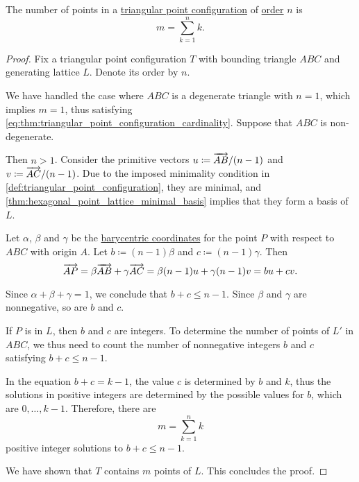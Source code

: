 \begin{proposition}\label{thm:triangular_point_configuration_cardinality}
  The number of points in a \hyperref[def:triangular_point_configuration]{triangular point configuration} of \hyperref[def:triangular_point_configuration_order]{order} \( n \) is
  \begin{equation}\label{eq:thm:triangular_point_configuration_cardinality}
    m = \sum_{k=1}^n k.
  \end{equation}
\end{proposition}
\begin{proof}
  Fix a triangular point configuration \( T \) with bounding triangle \( ABC \) and generating lattice \( L \). Denote its order by \( n \).

  We have handled the case where \( ABC \) is a degenerate triangle with \( n = 1 \), which implies \( m = 1 \), thus satisfying \eqref{eq:thm:triangular_point_configuration_cardinality}. Suppose that \( ABC \) is non-degenerate.

  Then \( n > 1 \). Consider the primitive vectors \( u \coloneqq \overrightarrow{AB} / (n - 1) \) and \( v \coloneqq \overrightarrow{AC} / (n - 1) \). Due to the imposed minimality condition in \cref{def:triangular_point_configuration}, they are minimal, and \cref{thm:hexagonal_point_lattice_minimal_basis} implies that they form a basis of \( L \).

  Let \( \alpha \), \( \beta \) and \( \gamma \) be the \hyperref[def:barycentric_coordinate_system]{barycentric coordinates} for the point \( P \) with respect to \( ABC \) with origin \( A \). Let \( b \coloneqq (n - 1)\beta \) and \( c \coloneqq (n - 1)\gamma \). Then
  \begin{equation*}
    \overrightarrow{AP} = \beta \overrightarrow{AB} + \gamma \overrightarrow{AC} = \beta (n - 1) u + \gamma (n - 1) v = bu + cv.
  \end{equation*}

  Since \( \alpha + \beta + \gamma = 1 \), we conclude that \( b + c \leq n - 1 \). Since \( \beta \) and \( \gamma \) are nonnegative, so are \( b \) and \( c \).

  If \( P \) is in \( L \), then \( b \) and \( c \) are integers. To determine the number of points of \( L' \) in \( ABC \), we thus need to count the number of nonnegative integers \( b \) and \( c \) satisfying \( b + c \leq n - 1 \).

  In the equation \( b + c = k - 1 \), the value \( c \) is determined by \( b \) and \( k \), thus the solutions in positive integers are determined by the possible values for \( b \), which are \( 0, \ldots, k - 1 \). Therefore, there are
  \begin{equation*}
    m = \sum_{k=1}^n k
  \end{equation*}
  positive integer solutions to \( b + c \leq n - 1 \).

  We have shown that \( T \) contains \( m \) points of \( L \). This concludes the proof.
\end{proof}

